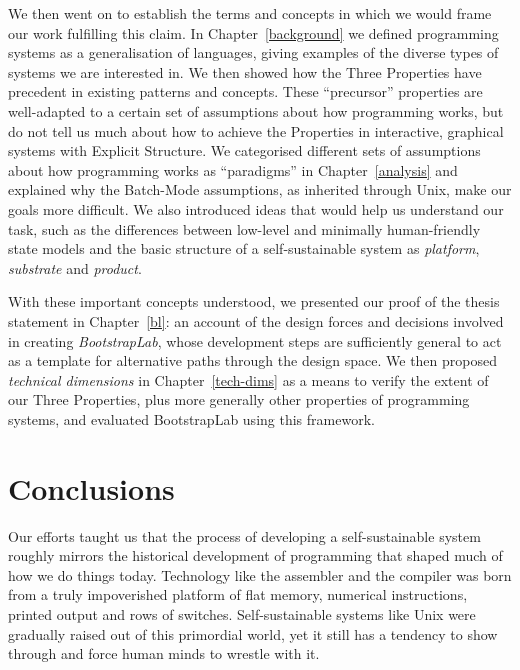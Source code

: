 \documentclass[ twoside,openright,titlepage,numbers=noenddot,headinclude,footinclude,cleardoublepage=empty,abstract=on,
                BCOR=5mm,paper=a4,fontsize=11pt
                ]{scrreprt}
\newcommand{\joel}[1]{}
\theoremstyle{definition}
\begin{document}
We then went on to establish the terms and concepts in which we would
frame our work fulfilling this claim. In Chapter~\ref{background} we
defined programming systems as a generalisation of languages, giving
examples of the diverse types of systems we are interested in. We then
showed how the Three Properties have precedent in existing patterns and
concepts. These ``precursor'' properties are well-adapted to a certain
set of assumptions about how programming works, but do not tell us much
about how to achieve the Properties in interactive, graphical systems
with Explicit Structure. We categorised different sets of assumptions
about how programming works as ``paradigms'' in Chapter~\ref{analysis}
and explained why the Batch-Mode assumptions, as inherited through Unix,
make our goals more difficult. We also introduced ideas that would help
us understand our task, such as the differences between low-level and
minimally human-friendly state models
\joel{(Section\ \ref{two-fundamentals-state-and-change}),} and the basic
structure of a self-sustainable system as \emph{platform},
\emph{substrate} and
\emph{product}\joel{(Section\ \ref{user-vs.-implementation-levels})}.

With these important concepts understood, we presented our proof of the
thesis statement in Chapter~\ref{bl}: an account of the design forces
and decisions involved in creating \emph{BootstrapLab}, whose
development steps are sufficiently general to act as a template for
alternative paths through the design space. We then proposed
\emph{technical dimensions} in Chapter~\ref{tech-dims} as a means to
verify the extent of our Three Properties, plus more generally other
properties of programming systems, and evaluated BootstrapLab using this
framework.

\hypertarget{conclusions}{\section{Conclusions}\label{conclusions}}

Our efforts taught us that the process of developing a self-sustainable
system roughly mirrors the historical development of programming that
shaped much of how we do things today. Technology like the assembler and
the compiler was born from a truly impoverished platform of flat memory,
numerical instructions, printed output and rows of switches.
Self-sustainable systems like Unix were gradually raised out of this
primordial world, yet it still has a tendency to show through and force
human minds to wrestle with it.
\end{document}
